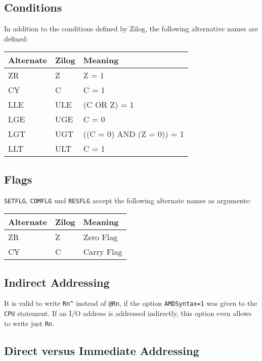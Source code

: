 \documentclass[12pt,twoside]{report}
\newcommand{\tty}[1]{{\tt #1}}
\begin{document}
\subsection{Conditions}

In addition to the conditions defined by Zilog, the following alternative names
are defined:

\begin{center}\begin{tabular}{|l|l|l|}
\hline
Alternate & Zilog & Meaning \\
\hline
\hline
ZR         & Z     & Z = 1 \\
CY         & C     & C = 1 \\
LLE        & ULE   & (C OR Z) = 1 \\
LGE        & UGE   & C = 0 \\
LGT        & UGT   & ((C = 0) AND (Z = 0)) = 1 \\
LLT        & ULT   & C = 1 \\
\hline
\end{tabular}\end{center}

\subsection{Flags}

\tty{SETFLG}, \tty{COMFLG} und \tty{RESFLG} accept the following alternate names
as arguments:

\begin{center}\begin{tabular}{|l|l|l|}
\hline
Alternate & Zilog & Meaning \\
\hline
\hline
ZR         & Z     & Zero Flag \\
CY         & C     & Carry Flag \\
\hline
\end{tabular}\end{center}

\subsection{Indirect Addressing}

It is valid to write \verb!Rn^! instead of \verb!@Rn!, if the option
\tty{AMDSyntax=1} was given to the \tty{CPU} statement.  If an I/O address
is addressed indirectly, this option even allows to write just \verb!Rn!.

\subsection{Direct versus Immediate Addressing}
\end{document}
